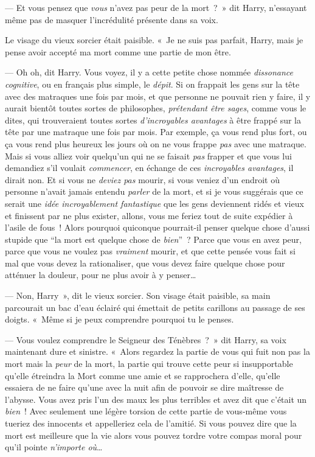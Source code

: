 --- Et vous pensez que \emph{vous} n'avez pas peur de la mort~?~» dit Harry, n'essayant même pas de masquer l'incrédulité présente dans sa voix.

Le visage du vieux sorcier était paisible. «~Je ne suis pas parfait, Harry, mais je pense avoir accepté ma mort comme une partie de mon être.

--- Oh oh, dit Harry. Vous voyez, il y a cette petite chose nommée \emph{dissonance cognitive}, ou en français plus simple, le \emph{dépit}. Si on frappait les gens sur la tête avec des matraques une fois par mois, et que personne ne pouvait rien y faire, il y aurait bientôt toutes sortes de philosophes, \emph{prétendant être sages}, comme vous le dites, qui trouveraient toutes sortes \emph{d'incroyables avantages} à être frappé sur la tête par une matraque une fois par mois. Par exemple, ça vous rend plus fort, ou ça vous rend plus heureux les jours où on ne vous frappe \emph{pas} avec une matraque. Mais si vous alliez voir quelqu'un qui ne se faisait \emph{pas} frapper et que vous lui demandiez s'il voulait \emph{commencer}, en échange de ces \emph{incroyables avantages}, il dirait non. Et si vous ne \emph{deviez pas} mourir, si vous veniez d'un endroit où personne n'avait jamais entendu \emph{parler} de la mort, et si je vous suggérais que ce serait une \emph{idée incroyablement fantastique} que les gens deviennent ridés et vieux et finissent par ne plus exister, allons, vous me feriez tout de suite expédier à l'asile de fous~! Alors pourquoi quiconque pourrait-il penser quelque chose d'aussi stupide que “la mort est quelque chose de \emph{bien}”~? Parce que vous en avez peur, parce que vous ne voulez pas \emph{vraiment} mourir, et que cette pensée vous fait si mal que vous devez la rationaliser, que vous devez faire quelque chose pour atténuer la douleur, pour ne plus avoir à y penser…

--- Non, Harry~», dit le vieux sorcier. Son visage était paisible, sa main parcourait un bac d'eau éclairé qui émettait de petits carillons au passage de ses doigts. «~Même si je peux comprendre pourquoi tu le penses.

--- Vous voulez comprendre le Seigneur des Ténèbres~?~» dit Harry, sa voix maintenant dure et sinistre. «~Alors regardez la partie de vous qui fuit non pas la mort mais la \emph{peur} de la mort, la partie qui trouve cette peur si insupportable qu'elle étreindra la Mort comme une amie et se rapprochera d'elle, qu'elle essaiera de ne faire qu'une avec la nuit afin de pouvoir se dire maîtresse de l'abysse. Vous avez pris l'un des maux les plus terribles et avez dit que c'était un \emph{bien}~! Avec seulement une légère torsion de cette partie de vous-même vous tueriez des innocents et appelleriez cela de l'amitié. Si vous pouvez dire que la mort est meilleure que la vie alors vous pouvez tordre votre compas moral pour qu'il pointe \emph{n'importe où}…

